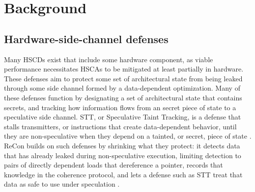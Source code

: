 \section{Background}
\subsection{Hardware-side-channel defenses}\label{sec:bg-defenses}
Many HSCDs exist that include some hardware component, as viable performance necessitates HSCAs to be mitigated at least partially in hardware. These defenses aim to protect some set of architectural state from being leaked through some side channel formed by a data-dependent optimization. Many of these defenses function by designating a set of architectural state that contains secrets, and tracking how information flows from an secret piece of state to a speculative side channel. STT, or Speculative Taint Tracking, is a defense that stalls transmitters, or instructions that create data-dependent behavior, until they are non-speculative when they depend on a tainted, or secret, piece of state \cite{yu2019stt}.
\notebr
{}
\notebr
ReCon builds on such defenses by shrinking what they protect: it detects data that has already leaked during non-speculative execution, limiting detection to pairs of directly dependent loads that dereference a pointer, records that knowledge in the coherence protocol, and lets a defense such as STT treat that data as safe to use under speculation \cite{recon}.
\notebr
{}
